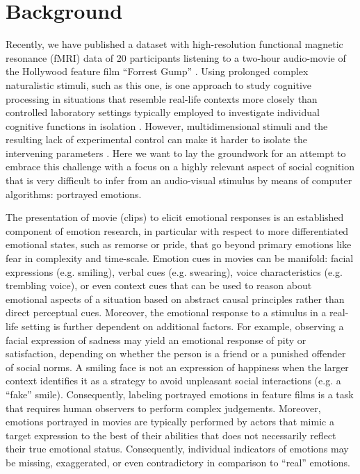 \section*{Background} 


Recently, we have published a dataset with high-resolution functional magnetic
resonance (fMRI) data of 20 participants listening to a two-hour audio-movie of
the Hollywood feature film ``Forrest Gump'' \cite{HBI+14}. Using prolonged
complex naturalistic stimuli, such as this one, is one approach to study
cognitive processing in situations that resemble real-life contexts more
closely than controlled laboratory settings typically employed to investigate
individual cognitive functions in isolation \cite{HH2012}. However,
multidimensional stimuli and the resulting lack of experimental control can
make it harder to isolate the intervening parameters \cite{HH2012}. Here we
want to lay the groundwork for an attempt to embrace this challenge with a
focus on a highly relevant aspect of social cognition that is
very difficult to infer from an audio-visual stimulus by means of computer
algorithms: portrayed emotions.

The presentation of movie (clips) to elicit emotional responses is an
established component of emotion research, in particular with respect to more
differentiated emotional states, such as remorse or pride, that go beyond
primary emotions like fear in complexity and time-scale\cite{GL1995}. Emotion
cues in movies can be manifold: facial expressions (e.g.
smiling)\cite{Ekm1992b}, verbal cues (e.g. swearing), voice characteristics
(e.g. trembling voice)\cite{EVS+2009}, or even context cues that can be used to
reason about emotional aspects of a situation based on abstract causal
principles rather than direct perceptual cues\cite{SS2014}.  Moreover, the
emotional response to a stimulus in a real-life setting is further dependent on
additional factors. For example, observing a facial expression of sadness may
yield an emotional response of pity or satisfaction, depending on whether the
person is a friend or a punished offender of social norms. A smiling face is
not an expression of happiness when the larger context identifies it as a
strategy to avoid unpleasant social interactions (e.g. a ``fake'' smile).
Consequently, labeling portrayed emotions in feature films is a task that
requires human observers to perform complex judgements. Moreover, emotions portrayed in
movies are typically performed by actors that mimic a target expression to the
best of their abilities that does not necessarily reflect their true emotional
status.  Consequently, individual indicators of emotions may be missing,
exaggerated, or even contradictory in comparison to ``real'' emotions.

